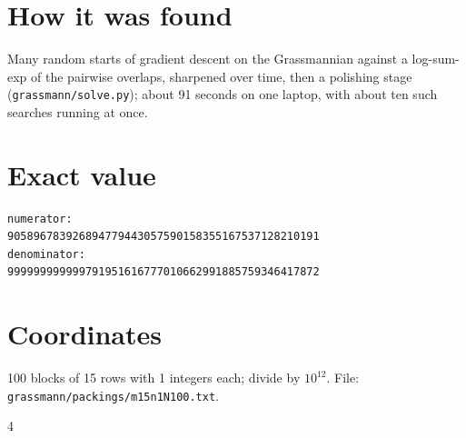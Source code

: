 \documentclass[11pt,a4paper]{article}
\begin{document}
\section{How it was found}
Many random starts of gradient descent on the Grassmannian against a log-sum-exp of the pairwise overlaps, sharpened over time, then a polishing stage (\texttt{grassmann/solve.py}); about 91 seconds on one laptop, with about ten such searches running at once.


\appendix
\section{Exact value}
{\small
\begin{verbatim}
numerator:
905896783926894779443057590158355167537128210191
denominator:
999999999999791951616777010662991885759346417872
\end{verbatim}}

\section{Coordinates}
100 blocks of 15 rows with 1 integers each; divide by $10^{12}$. File: \texttt{grassmann/packings/m15n1N100.txt}.
{\tiny
\begin{multicols}{4}
\end{multicols}}
\end{document}
